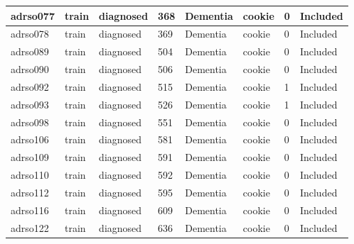 \begin{center}
\begin{longtable}{|l|l|l|l|l|l|l|l|}
adrso077       & train                 & diagnosed         & 368                & Dementia             & cookie          & 0                & Included      \\ \hline
adrso078       & train                 & diagnosed         & 369                & Dementia             & cookie          & 0                & Included      \\ \hline
adrso089       & train                 & diagnosed         & 504                & Dementia             & cookie          & 0                & Included      \\ \hline
adrso090       & train                 & diagnosed         & 506                & Dementia             & cookie          & 0                & Included      \\ \hline
adrso092       & train                 & diagnosed         & 515                & Dementia             & cookie          & 1                & Included      \\ \hline
adrso093       & train                 & diagnosed         & 526                & Dementia             & cookie          & 1                & Included      \\ \hline
adrso098       & train                 & diagnosed         & 551                & Dementia             & cookie          & 0                & Included      \\ \hline
adrso106       & train                 & diagnosed         & 581                & Dementia             & cookie          & 0                & Included      \\ \hline
adrso109       & train                 & diagnosed         & 591                & Dementia             & cookie          & 0                & Included      \\ \hline
adrso110       & train                 & diagnosed         & 592                & Dementia             & cookie          & 0                & Included      \\ \hline
adrso112       & train                 & diagnosed         & 595                & Dementia             & cookie          & 0                & Included      \\ \hline
adrso116       & train                 & diagnosed         & 609                & Dementia             & cookie          & 0                & Included      \\ \hline
adrso122       & train                 & diagnosed         & 636                & Dementia             & cookie          & 0                & Included      \\ \hline

\end{longtable}
\end{center}
